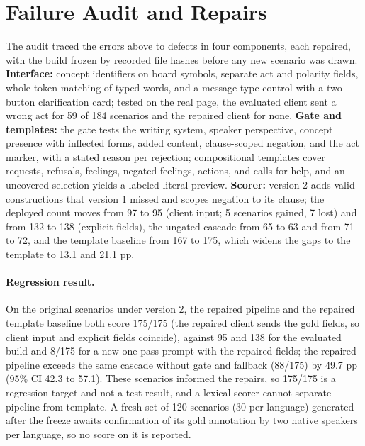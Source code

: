 \section{Failure Audit and Repairs}
\label{sec:repair}

The audit traced the errors above to defects in four components, each repaired, with the build frozen by recorded file hashes before any new scenario was drawn.
\textbf{Interface:} concept identifiers on board symbols, separate act and polarity fields, whole-token matching of typed words, and a message-type control with a two-button clarification card; tested on the real page, the evaluated client sent a wrong act for 59 of 184 scenarios and the repaired client for none.
\textbf{Gate and templates:} the gate tests the writing system, speaker perspective, concept presence with inflected forms, added content, clause-scoped negation, and the act marker, with a stated reason per rejection; compositional templates cover requests, refusals, feelings, negated feelings, actions, and calls for help, and an uncovered selection yields a labeled literal preview.
\textbf{Scorer:} version 2 adds valid constructions that version 1 missed and scopes negation to its clause; the deployed count moves from 97 to 95 (client input; 5 scenarios gained, 7 lost) and from 132 to 138 (explicit fields), the ungated cascade from 65 to 63 and from 71 to 72, and the template baseline from 167 to 175, which widens the gaps to the template to 13.1 and 21.1 pp.

\paragraph{Regression result.}
On the original \NPrimAll{} scenarios under version 2, the repaired pipeline and the repaired template baseline both score 175/175 (the repaired client sends the gold fields, so client input and explicit fields coincide), against 95 and 138 for the evaluated build and 8/175 for a new one-pass prompt with the repaired fields; the repaired pipeline exceeds the same cascade without gate and fallback (88/175) by 49.7 pp (95\% CI 42.3 to 57.1).
These scenarios informed the repairs, so 175/175 is a regression target and not a test result, and a lexical scorer cannot separate pipeline from template.
A fresh set of 120 scenarios (30 per language) generated after the freeze awaits confirmation of its gold annotation by two native speakers per language, so no score on it is reported.
